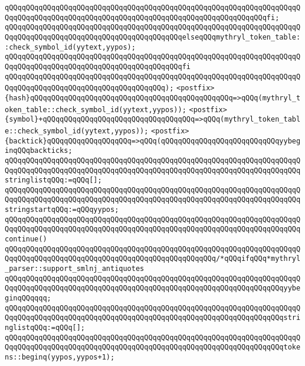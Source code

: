 \verb|qQQqqQQqqQQqqQQqqQQqqQQqqQQqqQQqqQQqqQQqqQQqqQQqqQQqqQQqqQQqqQQqqQQqqQQqqQQqqQQqqQQqqQQqqQQqqQQqqQQqqQQqqQQqqQQqqQQqqQQqqQQqqQQqqQQqfi;|\newline
\verb|qQQqqQQqqQQqqQQqqQQqqQQqqQQqqQQqqQQqqQQqqQQqqQQqqQQqqQQqqQQqqQQqqQQqqQQqqQQqqQQqqQQqqQQqqQQqqQQqqQQqqQQqqQQqqQQqelseqQQqmythryl_token_table::check_symbol_id(yytext,yypos);|\newline
\verb|qQQqqQQqqQQqqQQqqQQqqQQqqQQqqQQqqQQqqQQqqQQqqQQqqQQqqQQqqQQqqQQqqQQqqQQqqQQqqQQqqQQqqQQqqQQqqQQqqQQqqQQqqQQqqQQqfi|\newline
\verb|qQQqqQQqqQQqqQQqqQQqqQQqqQQqqQQqqQQqqQQqqQQqqQQqqQQqqQQqqQQqqQQqqQQqqQQqqQQqqQQqqQQqqQQqqQQqqQQqqQQqqQQqqQQq);|\newline
\verb|<postfix>{hash}qQQqqQQqqQQqqQQqqQQqqQQqqQQqqQQqqQQqqQQqqQQqqQQq=>qQQq(mythryl_token_table::check_symbol_id(yytext,yypos));|\newline
\verb|<postfix>{symbol}+qQQqqQQqqQQqqQQqqQQqqQQqqQQqqQQqqQQq=>qQQq(mythryl_token_table::check_symbol_id(yytext,yypos));|\newline
\verb|<postfix>{backtick}qQQqqQQqqQQqqQQqqQQq=>qQQq(qQQqqQQqqQQqqQQqqQQqqQQqqQQqyybeginqQQqbackticks;|\newline
\verb|qQQqqQQqqQQqqQQqqQQqqQQqqQQqqQQqqQQqqQQqqQQqqQQqqQQqqQQqqQQqqQQqqQQqqQQqqQQqqQQqqQQqqQQqqQQqqQQqqQQqqQQqqQQqqQQqqQQqqQQqqQQqqQQqqQQqqQQqqQQqstringlistqQQq:=qQQq[];|\newline
\verb|qQQqqQQqqQQqqQQqqQQqqQQqqQQqqQQqqQQqqQQqqQQqqQQqqQQqqQQqqQQqqQQqqQQqqQQqqQQqqQQqqQQqqQQqqQQqqQQqqQQqqQQqqQQqqQQqqQQqqQQqqQQqqQQqqQQqqQQqqQQqstringstartqQQq:=qQQqyypos;|\newline
\verb|qQQqqQQqqQQqqQQqqQQqqQQqqQQqqQQqqQQqqQQqqQQqqQQqqQQqqQQqqQQqqQQqqQQqqQQqqQQqqQQqqQQqqQQqqQQqqQQqqQQqqQQqqQQqqQQqqQQqqQQqqQQqqQQqqQQqqQQqqQQqcontinue()|\newline
\verb|qQQqqQQqqQQqqQQqqQQqqQQqqQQqqQQqqQQqqQQqqQQqqQQqqQQqqQQqqQQqqQQqqQQqqQQqqQQqqQQqqQQqqQQqqQQqqQQqqQQqqQQqqQQqqQQqqQQqqQQq/*qQQqifqQQq*mythryl_parser::support_smlnj_antiquotes|\newline
\verb|qQQqqQQqqQQqqQQqqQQqqQQqqQQqqQQqqQQqqQQqqQQqqQQqqQQqqQQqqQQqqQQqqQQqqQQqqQQqqQQqqQQqqQQqqQQqqQQqqQQqqQQqqQQqqQQqqQQqqQQqqQQqqQQqqQQqqQQqyybeginqQQqqqq;|\newline
\verb|qQQqqQQqqQQqqQQqqQQqqQQqqQQqqQQqqQQqqQQqqQQqqQQqqQQqqQQqqQQqqQQqqQQqqQQqqQQqqQQqqQQqqQQqqQQqqQQqqQQqqQQqqQQqqQQqqQQqqQQqqQQqqQQqqQQqqQQqstringlistqQQq:=qQQq[];|\newline
\verb|qQQqqQQqqQQqqQQqqQQqqQQqqQQqqQQqqQQqqQQqqQQqqQQqqQQqqQQqqQQqqQQqqQQqqQQqqQQqqQQqqQQqqQQqqQQqqQQqqQQqqQQqqQQqqQQqqQQqqQQqqQQqqQQqqQQqqQQqtokens::beginq(yypos,yypos+1);|\newline
